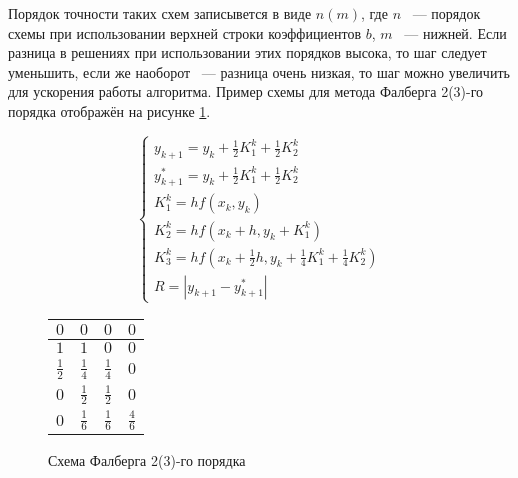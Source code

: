 Порядок точности таких схем записывется в виде $n(m)$, где $n$ ~--- порядок схемы при использовании верхней строки коэффициентов
$b$, $m$ ~--- нижней. Если разница в решениях при использовании этих порядков высока, то шаг следует уменьшить, если же наоборот ~---
разница очень низкая, то шаг можно увеличить для ускорения работы алгоритма.
Пример схемы для метода Фалберга 2(3)-го порядка отображён на рисунке \ref{fig:Falberg2}.

\begin{figure}
    \begin{minipage}[t]{8.5cm}
        {\small
        \begin{equation*}
            \begin{cases}
                y_{k + 1} = y_k + \frac{1}{2}K_1^k + \frac{1}{2}K_2^k\\
                y^{*}_{k + 1} = y_k + \frac{1}{2}K_1^k + \frac{1}{2}K_2^k\\
                K_1^k = hf(x_k, y_k)\\
                K_2^k = hf(x_k + h, y_k + K_1^k)\\
                K_3^k = hf(x_k + \frac{1}{2}h, y_k + \frac{1}{4}K_1^k + \frac{1}{4}K_2^k)\\
                R = |y_{k + 1} - y^{*}_{k + 1}|
            \end{cases}
        \end{equation*}
        }
    \end{minipage}
    \begin{minipage}[t]{7.5cm}
        \begin{table}
            \begin{tabular}{|c|c|c|c|}
            \hline
            $0$ & $0$ & $0$ & $0$\\
            \hline
            $1$ & $1$ & $0$ & $0$\\
            \hline
            $\frac{1}{2}$ & $\frac{1}{4}$ & $\frac{1}{4}$ & $0$\\
            \hline
            $0$ & \cellcolor{lightgray} $\frac{1}{2}$ & \cellcolor{lightgray} $\frac{1}{2}$ & \cellcolor{lightgray} $0$\\
            \hline
            $0$ & \cellcolor{lightgray} $\frac{1}{6}$ & \cellcolor{lightgray} $\frac{1}{6}$ & \cellcolor{lightgray} $\frac{4}{6}$\\
            \hline
            \end{tabular}
        \end{table}
    \end{minipage}
    \caption{Схема Фалберга 2(3)-го порядка}
    \label{fig:Falberg2}
\end{figure}

